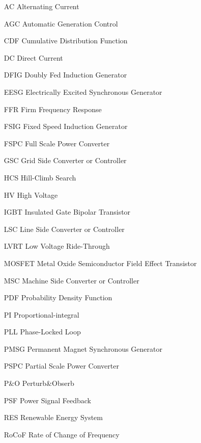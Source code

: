 \begin{glossary}{}

\begin{itemize}[leftmargin=4.5em,align=parleft,labelsep=1cm]
	
\item[AC] 		Alternating Current
\item[AGC] 		Automatic Generation Control
\item[CDF] 		Cumulative Distribution Function
\item[DC] 		Direct Current
\item[DFIG] 	Doubly Fed Induction Generator
\item[EESG] 	Electrically Excited Synchronous Generator
\item[FFR] 		Firm Frequency Response
\item[FSIG] 	Fixed Speed Induction Generator
\item[FSPC] 	Full Scale Power Converter
\item[GSC] 		Grid Side Converter or Controller
\item[HCS] 		Hill-Climb Search
\item[HV]		High Voltage
\item[IGBT] 	Insulated Gate Bipolar Transistor
\item[LSC] 		Line Side Converter or Controller
\item[LVRT] 	Low Voltage Ride-Through
\item[MOSFET] 	Metal Oxide Semiconductor Field Effect Transistor
\item[MSC] 		Machine Side Converter or Controller
\item[PDF] 		Probability Density Function
\item[PI] 		Proportional-integral
\item[PLL] 		Phase-Locked Loop
\item[PMSG] 	Permanent Magnet Synchronous Generator
\item[PSPC] 	Partial Scale Power Converter
\item[P\&O] 	Perturb\&Obserb
\item[PSF] 		Power Signal Feedback
\item[RES] 		Renewable Energy System
\item[RoCoF] 	Rate of Change of Frequency

\end{itemize}

\end{glossary}
